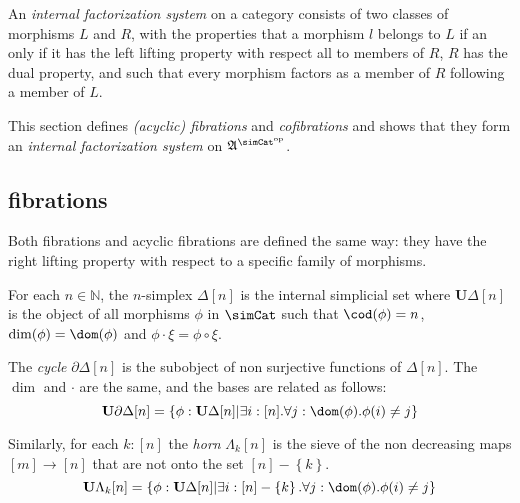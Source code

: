 \documentclass{tac}
\newcommand\hide[1]{}
\newcommand\set[1]{\left\{#1\right\}}
\newcommand\N{\mathbb N}
\newcommand\dual{^{\mathrm{op}}}
\newcommand\s{^{\simCat\dual}}
\newcommand\of{:}
\newcommand\simplex\Delta
\newcommand\cycle{\partial\Delta}
\newcommand\horn\Lambda
\newcommand\base{\mathbf{U}}
\newcommand\ambient{\mathfrak A}
\begin{document}
\begin{definition} An \emph{internal factorization system} on a category consists of two classes of morphisms $L$ and $R$, with the properties that a morphism $l$ belongs to $L$ if an only if it has the left lifting property with respect all to members of $R$, $R$ has the dual property, and such that every morphism factors as a member of $R$ following a member of $L$.\end{definition}

This section defines \emph{(acyclic) fibrations} and \emph{cofibrations} and shows that they form an \emph{internal factorization system} on $\ambient\s$.

\subsection{fibrations}
\hide{ 

Idea: define Kan fibrations, define cofibrations, demonstrate the lifting properties. Move on happily.

New idea: go by factorization system.

1. The lifting properties of cofibrations
2. Factorization property

}
Both fibrations and acyclic fibrations are defined the same way: they have the right lifting property with respect to a specific family of morphisms.

\hide{ Add def. of sieve over $\simCat$
Wrong: I was calling it a sieve because I was thinking of the category of elements of $\simplex[n]$
$\ambient\s$ defined?
Member functions for internal simplicial objects?
 }
\begin{definition} For each $n\in\N$, the $n$-simplex $\simplex[n]$ is the internal simplicial set where $\base{\simplex[n]}$ is the object of all morphisms $\phi$ in $\simCat$ such that $\cod(\phi) = n$, $\dim(\phi) = \dom(\phi)$ and $\phi\cdot \xi = \phi\circ \xi$.

The \emph{cycle} $\cycle[n]$ is the subobject of non surjective functions of $\simplex[n]$. The $\dim$ and $\cdot$ are the same, and the bases are related as follows:
\[ \base{\cycle[n]} = \set{\phi\of\base{\simplex[n]}| \exists i\of[n].\forall j\of \dom(\phi).\phi(i)\neq j } \]

Similarly, for each $k\of[n]$ the \emph{horn} $\horn_k[n]$ is the sieve of the non decreasing maps $[m]\to [n]$ that are not onto the set $[n]-\set{k}$.
\[ \base{\horn_k[n]} = \set{\phi\of\base{\simplex[n]}| \exists i\of[n]-\set k.\forall j\of \dom(\phi).\phi(i)\neq j } \]

\end{definition}
\end{document}
